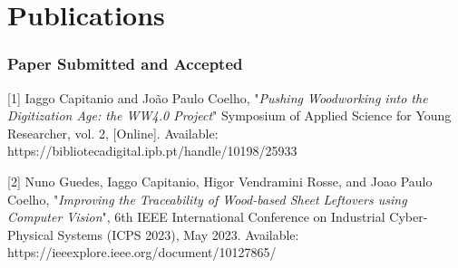 \chapter{Publications}\label{apendice3}

\subsection*{Paper Submitted and Accepted}

[1] Iaggo Capitanio and João Paulo Coelho, "\textit{Pushing Woodworking into the Digitization Age: the WW4.0 Project}" Symposium of  Applied Science for  Young Researcher, vol. 2, [Online]. Available: https://bibliotecadigital.ipb.pt/handle/10198/25933

[2] Nuno Guedes, Iaggo Capitanio, Higor Vendramini Rosse, and Joao Paulo Coelho, "\textit{Improving the Traceability of Wood-based Sheet Leftovers using Computer Vision}", 6th IEEE International Conference on Industrial Cyber-Physical Systems (ICPS 2023), May 2023. Available: https://ieeexplore.ieee.org/document/10127865/


